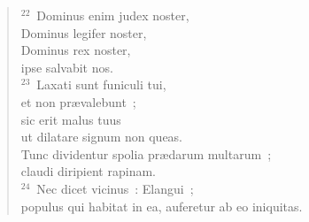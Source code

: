 \begin{verse}
${}^{22}$~Dominus enim judex noster,\\ Dominus legifer noster,\\ Dominus rex noster,\\ ipse salvabit nos.\\
${}^{23}$~Laxati sunt funiculi tui,\\ et non pr\ae valebunt~;\\ sic erit malus tuus\\ ut dilatare signum non queas.\\ Tunc dividentur spolia pr\ae darum multarum~;\\ claudi diripient rapinam.\\
${}^{24}$~Nec dicet vicinus~: Elangui~;\\ populus qui habitat in ea, auferetur ab eo iniquitas.\end{verse}


